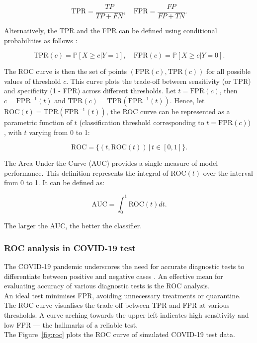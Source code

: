 \documentclass{article}\usepackage[]{graphicx}\usepackage[]{xcolor}
\numberwithin{equation}{section}
\begin{document}
\[\text{TPR} = \frac{TP}{TP+FN}, \quad \text{FPR} = \frac{FP}{FP+TN}.\]

\noindent
Alternatively, the TPR and the FPR can be defined using conditional probabilities as follows \cite{Pepe2003}:

\[\text{TPR}(c) = \mathbb{P}[X \geq c | Y = 1], \quad \text{FPR}(c) = \mathbb{P}[X \geq c | Y = 0].\]

\noindent
The ROC curve is then the set of points $(\text{FPR}(c), \text{TPR}(c))$ for all possible values of threshold $c$. This curve plots the trade-off between sensitivity (or TPR) and specificity (1 - FPR) across different thresholds. Let $t=\text{FPR}(c)$, then $c = \text{FPR}^{-1}(t)$ and $\text{TPR}(c)= \text{TPR}(\text{FPR}^{-1}(t))$. Hence, let $\text{ROC}(t)= \text{TPR}(\text{FPR}^{-1}(t))$, the ROC curve can be represented as a parametric function of $t$ (classification threshold corresponding to $t=\text{FPR}(c)$) \cite{Pepe2003} , with $t$ varying from 0 to 1:

\[ \text{ROC} = \{ (t, \text{ROC}(t)) \,|\, t \in [0, 1] \}.\]

\noindent
The Area Under the Curve (AUC) \cite{Pepe2003}  provides a single measure of model performance. This definition represents the integral of $\text{ROC}(t)$ over the interval from 0 to 1. It can be defined as:

\[ \text{AUC} = \int_{0}^{1} \text{ROC}(t) dt.\]

\noindent
The larger the AUC, the better the classifier.

\subsubsection{ROC analysis in COVID-19 test}

The COVID-19 pandemic underscores the need for accurate diagnostic tests to differentiate between positive and negative cases \cite{Garcia2021ROCAlly}. An effective mean for evaluating accuracy of various diagnostic tests is the ROC analysis.\\

\noindent
An ideal test minimises FPR, avoiding unnecessary treatments or quarantine. The ROC curve visualises the trade-off between TPR and FPR at various thresholds. A curve arching towards the upper left indicates high sensitivity and low FPR — the hallmarks of a reliable test.\\

\noindent
The Figure~\ref{fig:roc} plots the ROC curve of simulated COVID-19 test data. 
\end{document}
